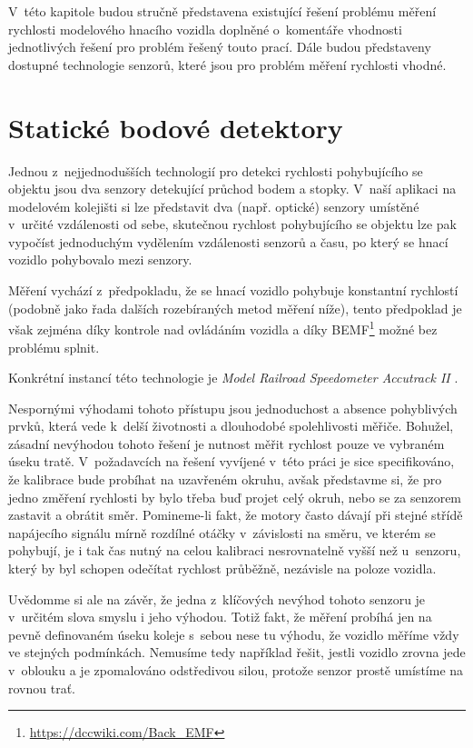 V~této kapitole budou stručně představena existující řešení problému měření
rychlosti modelového hnacího vozidla doplněné o~komentáře vhodnosti
jednotlivých řešení pro problém řešený touto prací. Dále budou představeny
dostupné technologie senzorů, které jsou pro problém měření rychlosti vhodné.

\section{Statické bodové detektory}

Jednou z~nejjednodušších technologií pro detekci rychlosti pohybujícího se
objektu jsou dva senzory detekující průchod bodem
a stopky. V~naší aplikaci na modelovém kolejišti si lze představit dva
(např. optické) senzory umístěné v~určité vzdálenosti od sebe, skutečnou
rychlost pohybujícího se objektu lze pak vypočíst jednoduchým vydělením
vzdálenosti senzorů a času, po který se hnací vozidlo pohybovalo mezi senzory.

Měření vychází z~předpokladu, že se hnací vozidlo pohybuje konstantní
rychlostí (podobně jako řada dalších rozebíraných metod měření níže), tento
předpoklad je však zejména díky kontrole nad ovládáním vozidla a díky
BEMF\footnote{\url{https://dccwiki.com/Back\_EMF}}
možné bez problému splnit.

Konkrétní instancí této technologie je \textit{Model Railroad
Speedometer Accutrack II} \cite{accutrackII}.

Nespornými výhodami tohoto přístupu jsou jednoduchost a absence pohyblivých
prvků, která vede k~delší životnosti a dlouhodobé spolehlivosti měřiče.
Bohužel, zásadní nevýhodou tohoto řešení je nutnost měřit rychlost pouze ve
vybraném úseku tratě. V~požadavcích na řešení vyvíjené v~této práci je sice
specifikováno, že kalibrace bude probíhat na uzavřeném okruhu, avšak představme
si, že pro jedno změření rychlosti by bylo třeba buď projet celý okruh, nebo se
za senzorem zastavit a obrátit směr. Pomineme-li fakt, že motory často dávají
při stejné střídě napájecího signálu mírně rozdílné otáčky v~závislosti na
směru, ve kterém se pohybují, je i tak čas nutný na celou kalibraci
nesrovnatelně vyšší než u~senzoru, který by byl schopen odečítat rychlost
průběžně, nezávisle na poloze vozidla.

Uvědomme si ale na závěr, že jedna z~klíčových nevýhod tohoto senzoru je
v~určitém slova smyslu i jeho výhodou. Totiž fakt, že měření probíhá jen na pevně
definovaném úseku koleje s~sebou nese tu výhodu, že vozidlo měříme vždy ve
stejných podmínkách. Nemusíme tedy například řešit, jestli vozidlo zrovna jede
v~oblouku a je zpomalováno odstředivou silou, protože senzor prostě umístíme
na rovnou trať.

